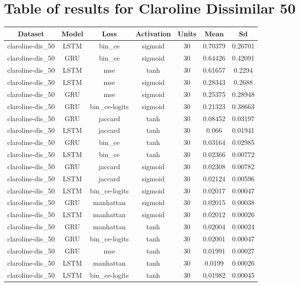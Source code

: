 \documentclass{article}%
\begin{document}
%
\newpage%
\section{Table of results for Claroline Dissimilar 50}%
\label{sec:TableofresultsforClarolineDissimilar50}%
\begin{longtable}{|c|c|c|c|c|c|c|}%
\hline%
\rowcolor{lightgray!70}%
\textbf{Dataset}&\textbf{Model}&\textbf{Loss}&\textbf{Activation}&\textbf{Units}&\textbf{Mean}&\textbf{Sd}\\%
\hline%
claroline{-}dis\_50&LSTM&bin\_ce&sigmoid&30&0.70379&0.26701\\%
\hline%
claroline{-}dis\_50&GRU&bin\_ce&sigmoid&30&0.64426&0.42091\\%
\hline%
claroline{-}dis\_50&LSTM&mse&tanh&30&0.61657&0.2294\\%
\hline%
claroline{-}dis\_50&LSTM&mse&sigmoid&30&0.28343&0.2688\\%
\hline%
claroline{-}dis\_50&GRU&mse&sigmoid&30&0.25375&0.28948\\%
\hline%
claroline{-}dis\_50&GRU&bin\_ce{-}logits&sigmoid&30&0.21323&0.38663\\%
\hline%
claroline{-}dis\_50&GRU&jaccard&tanh&30&0.08452&0.03197\\%
\hline%
claroline{-}dis\_50&LSTM&jaccard&tanh&30&0.066&0.01941\\%
\hline%
claroline{-}dis\_50&GRU&bin\_ce&tanh&30&0.03164&0.02985\\%
\hline%
claroline{-}dis\_50&LSTM&bin\_ce&tanh&30&0.02366&0.00772\\%
\hline%
claroline{-}dis\_50&GRU&jaccard&sigmoid&30&0.02308&0.00782\\%
\hline%
claroline{-}dis\_50&LSTM&jaccard&sigmoid&30&0.02124&0.00596\\%
\hline%
claroline{-}dis\_50&LSTM&bin\_ce{-}logits&sigmoid&30&0.02017&0.00047\\%
\hline%
claroline{-}dis\_50&GRU&manhattan&sigmoid&30&0.02015&0.00038\\%
\hline%
claroline{-}dis\_50&LSTM&manhattan&sigmoid&30&0.02012&0.00026\\%
\hline%
claroline{-}dis\_50&GRU&manhattan&tanh&30&0.02004&0.00024\\%
\hline%
claroline{-}dis\_50&GRU&bin\_ce{-}logits&tanh&30&0.02001&0.00047\\%
\hline%
claroline{-}dis\_50&GRU&mse&tanh&30&0.01991&0.00027\\%
\hline%
claroline{-}dis\_50&LSTM&manhattan&tanh&30&0.0199&0.00026\\%
\hline%
claroline{-}dis\_50&LSTM&bin\_ce{-}logits&tanh&30&0.01982&0.00045\\%
\hline%
\end{longtable}
\end{document}
